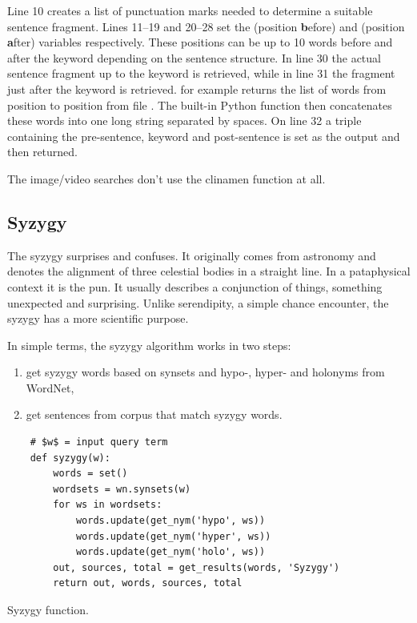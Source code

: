 Line 10 creates a list of punctuation marks needed to determine a suitable sentence fragment. Lines 11--19 and 20--28 set the  (position \textbf{b}efore) and  (position \textbf{a}fter) variables respectively. These positions can be up to 10 words before and after the keyword  depending on the sentence structure. In line 30 the actual sentence fragment up to the keyword is retrieved, while in line 31 the fragment just after the keyword is retrieved.  for example returns the list of words from position  to position  from file . The built-in Python  function then concatenates these words into one long string separated by spaces. On line 32 a triple containing the pre-sentence, keyword and post-sentence is set as the output and then returned.

The image/video searches don't use the clinamen function at all.


\subsection{Syzygy}

The syzygy surprises and confuses. It originally comes from astronomy and denotes the alignment of three celestial bodies in a straight line. In a pataphysical context it is the pun. It usually describes a conjunction of things, something unexpected and surprising. Unlike serendipity, a simple chance encounter, the syzygy has a more scientific purpose.

In simple terms, the syzygy algorithm works in two steps:
\begin{enumerate}
  \item get syzygy words based on synsets and hypo-, hyper- and holonyms from WordNet,
  \item get sentences from corpus that match syzygy words.
\end{enumerate}

\begin{listing}
  \begin{verbatim}
    # $w$ = input query term
    def syzygy(w):
        words = set()
        wordsets = wn.synsets(w)
        for ws in wordsets:
            words.update(get_nym('hypo', ws))
            words.update(get_nym('hyper', ws))
            words.update(get_nym('holo', ws))
        out, sources, total = get_results(words, 'Syzygy')
        return out, words, sources, total
  \end{verbatim}
\caption{Syzygy function.}
\label{code:syzygy}
\end{listing}

